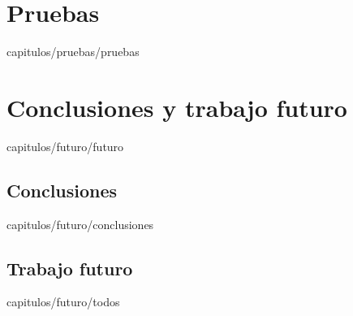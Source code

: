 \documentclass[epsbased,copyright,final,printable,covers,extendedindex,firstnumbered,tfg,gnuplot]{thesis}
\begin{document}
\chapter{Pruebas\label{CAP:PRUEBAS}}{capitulos/pruebas/pruebas}

\chapter{Conclusiones y trabajo futuro\label{CAP:FUTURO}}{capitulos/futuro/futuro}
  \section{Conclusiones\label{SEC:CONCLUSIONES}}{capitulos/futuro/conclusiones}
  \section{Trabajo futuro\label{SEC:TODOS}}{capitulos/futuro/todos}
\end{document}
